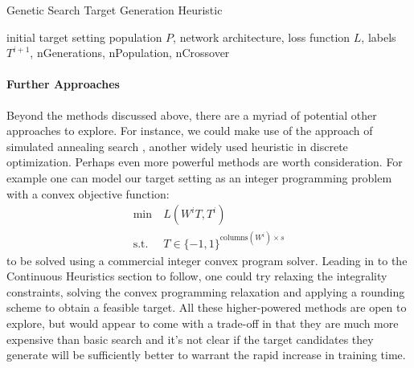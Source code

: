 \begin{algorithm}
\caption{Genetic Search Target Generation Heuristic}
\begin{algorithmic}
\REQUIRE initial target setting population $P$, network architecture, loss function $L$, labels $T^{i+1}$, nGenerations, nPopulation, nCrossover
 
 
  
\ENDFOR
{}
\ENDFOR
{}
\end{algorithmic}
\end{algorithm} 

\paragraph{Further Approaches}
Beyond the methods discussed above, there are a myriad of potential other approaches to explore. For instance, we could make use of the approach of simulated annealing search \cite{kirkpatrick1983optimization}, another widely used heuristic in discrete optimization. Perhaps even more powerful methods are worth consideration. For example one can model our target setting as an integer programming problem with a convex objective function:
\begin{align*}
\min\ &L(W^iT, T^i)\\
\text{s.t. } &T \in \{-1,1\}^{\text{columns}(W^i)\times s}
\end{align*}
to be solved using a commercial integer convex program solver. Leading in to the Continuous Heuristics section to follow, one could try relaxing the integrality constraints, solving the convex programming relaxation and applying a rounding scheme to obtain a feasible target. All these higher-powered methods are open to explore, but would appear to come with a trade-off in that they are much more expensive than basic search and it's not clear if the target candidates they generate will be sufficiently better to warrant the rapid increase in training time.

